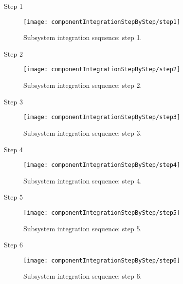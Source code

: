 	\begin{description}
	
	\item Step 1		
		\begin{figure}[H]
			\centering
			\texttt{[image: componentIntegrationStepByStep/step1]}
			\caption{Subsystem integration sequence: step 1.}
		\end{figure}
	
	\vfill
	\item Step 2
		\begin{figure}[H]
			\centering
			\texttt{[image: componentIntegrationStepByStep/step2]}
			\caption{Subsystem integration sequence: step 2.}
		\end{figure}
	
	\bigskip
	\item Step 3
		\begin{figure}[H]
			\centering
			\texttt{[image: componentIntegrationStepByStep/step3]}
			\caption{Subsystem integration sequence: step 3.}
		\end{figure}
		
	\bigskip
	\item Step 4
		\begin{figure}[H]
			\centering
			\texttt{[image: componentIntegrationStepByStep/step4]}
			\caption{Subsystem integration sequence: step 4.}
		\end{figure}
		
	\bigskip
	\item Step 5
		\begin{figure}[H]
			\centering
			\texttt{[image: componentIntegrationStepByStep/step5]}
			\caption{Subsystem integration sequence: step 5.}
		\end{figure}
		
	\bigskip	
	\item Step 6
		\begin{figure}[H]
			\centering
			\texttt{[image: componentIntegrationStepByStep/step6]}
			\caption{Subsystem integration sequence: step 6.}
		\end{figure}

	\end{description}
	